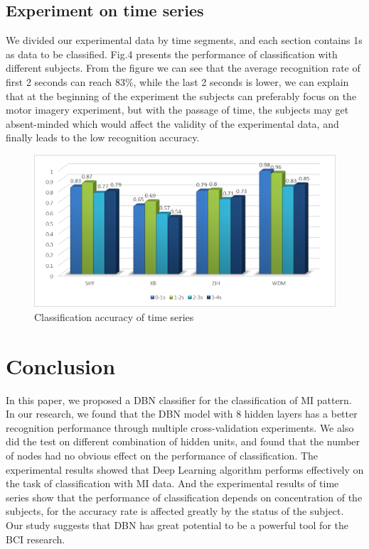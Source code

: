 \documentclass{llncs}
\begin{document}
\subsection{Experiment on time series}
We divided our experimental data by time segments, and each section contains 1s as data to be classified. Fig.4 presents the performance of classification with different subjects. From the figure we can see that the average recognition rate of first 2 seconds can reach 83\%, while the last 2 seconds is lower, we can explain that at the beginning of the experiment the subjects can preferably focus on the motor imagery experiment, but with the passage of time, the subjects may get absent-minded which would affect the validity of the experimental data, and finally leads to the low recognition accuracy. 
\begin{figure}[!htbp]
	\centering
		\includegraphics[scale=0.55]{figs/ax3.png}
		
		\caption{Classification accuracy of time series}  
    	\label{fig:4}
\end{figure}


\section{Conclusion}
In this paper, we proposed a DBN classifier for the classification of MI pattern. In our research, we found that the DBN model with 8 hidden layers has a better recognition performance through multiple cross-validation experiments. We also did the test on different combination of hidden units, and found that the number of nodes had no obvious effect on the performance of classification. The experimental results showed that Deep Learning algorithm performs effectively on the task of classification with MI data. And the experimental results of time series show that the performance of classification depends on concentration of the subjects, for the accuracy rate is affected greatly by the status of the subject. Our study suggests that DBN has great potential to be a powerful tool for the BCI research. 
\end{document}
